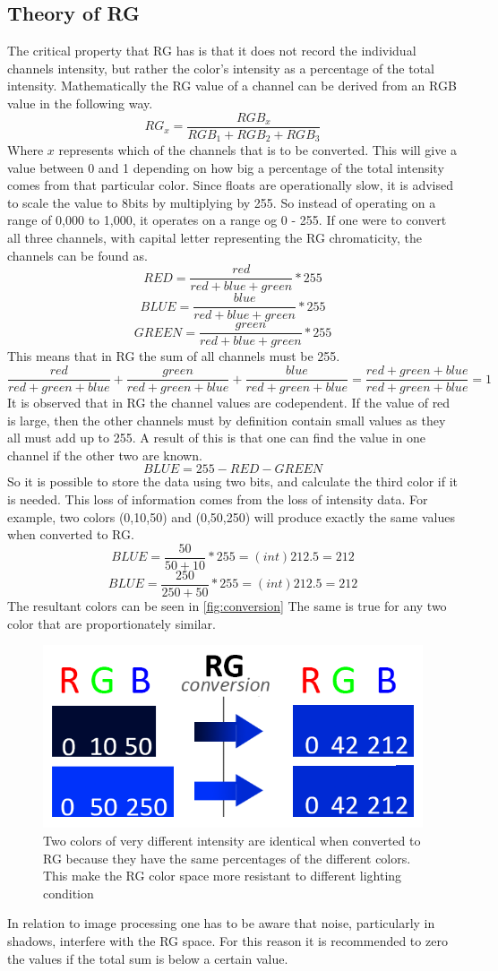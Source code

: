 \subsection{Theory of RG}\label{sec:theoryOfRG}
The critical property that RG has is that it does not record the individual channels intensity, but rather the color's intensity as a percentage of the total intensity. Mathematically the RG value of a channel can be derived from an RGB value in the following way.
\[ RG_x = \frac{RGB_x}{RGB_1 + RGB_2 + RGB_3}\]
Where $x$ represents which of the channels that is to be converted. This will give a value between 0 and 1 depending on how big a percentage of the total intensity comes from that particular color. Since floats are operationally slow, it is advised to scale the value to 8bits by multiplying by 255. So instead of operating on a range of 0,000 to 1,000, it operates on a range og 0 - 255. If one were to convert all three channels, with capital letter representing the RG chromaticity, the channels can be found as.
\[ RED = \frac{red}{red + blue + green} * 255\]
\[ BLUE = \frac{blue}{red + blue + green} * 255\]
\[ GREEN = \frac{green}{red + blue + green} * 255\]
This means that in RG the sum of all channels must be 255.
\[ \frac{red}{red + green + blue} + \frac{green}{red + green + blue} +  \frac{blue}{red + green + blue} =  \frac{red + green + blue}{red + green + blue} = 1\]
It is observed that in RG the channel values are codependent. If the value of red is large, then the other channels must by definition contain small values as they all must add up to 255. A result of this is that one can find the value in one channel if the other two are known.
\[ BLUE = 255 - RED - GREEN\]
So it is possible to store the data using two bits, and calculate the third color if it is needed. This loss of information comes from the loss of intensity data\cite{NormRGB}. For example, two colors (0,10,50) and (0,50,250) will produce exactly the same values when converted to RG.
\[ BLUE = \frac{50}{50 + 10} * 255 = (int)212.5 = 212 \]
\[ BLUE = \frac{250}{250 + 50} * 255 = (int)212.5 = 212 \]
The resultant colors can be seen in \autoref{fig:conversion} The same is true for any two color that are proportionately similar.\\
\begin{figure}[H]
	\centering
	\includegraphics[width=0.6\linewidth]{figure/Analysis/rgconversion.png}
	\caption{Two colors of very different intensity are identical when converted to RG because they have the same percentages of the different colors. This make the RG color space more resistant to different lighting condition}
	\label{fig:conversion}
\end{figure} 
In relation to image processing one has to be aware that noise, particularly in shadows, interfere with the RG space. For this reason it is recommended to zero the values if the total sum is below a certain value.

